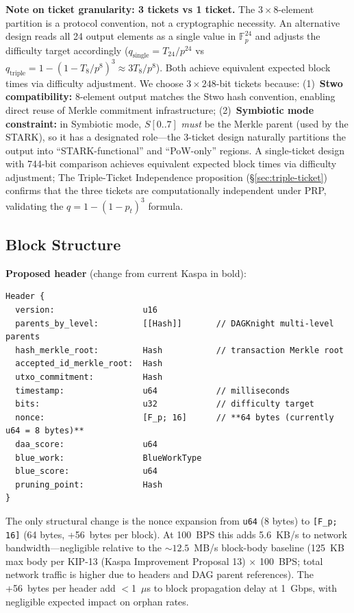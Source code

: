 \documentclass[11pt,a4paper]{article}
\begin{document}
\textbf{Note on ticket granularity: 3 tickets vs 1 ticket.} The $3 \times 8$-element partition is a protocol convention, not a cryptographic necessity. An alternative design reads all 24 output elements as a single value in $\mathbb{F}_p^{24}$ and adjusts the difficulty target accordingly ($q_{\mathrm{single}} = T_{24}/p^{24}$ vs $q_{\mathrm{triple}} = 1-(1-T_8/p^8)^3 \approx 3 T_8/p^8$). Both achieve equivalent expected block times via difficulty adjustment. We choose $3 \times 248$-bit tickets because: (1)~\textbf{Stwo compatibility:} 8-element output matches the Stwo hash convention, enabling direct reuse of Merkle commitment infrastructure; (2)~\textbf{Symbiotic mode constraint:} in Symbiotic mode, $S[0..7]$ \emph{must} be the Merkle parent (used by the STARK), so it has a designated role---the 3-ticket design naturally partitions the output into ``STARK-functional'' and ``PoW-only'' regions. A single-ticket design with 744-bit comparison achieves equivalent expected block times via difficulty adjustment; The Triple-Ticket Independence proposition (\S\ref{sec:triple-ticket}) confirms that the three tickets are computationally independent under PRP, validating the $q = 1-(1-p_t)^3$ formula.

\subsection{Block Structure}
\label{sec:block}

\textbf{Proposed header} (change from current Kaspa in bold):

\begin{Verbatim}[fontsize=\small]
Header {
  version:                  u16
  parents_by_level:         [[Hash]]       // DAGKnight multi-level parents
  hash_merkle_root:         Hash           // transaction Merkle root
  accepted_id_merkle_root:  Hash
  utxo_commitment:          Hash
  timestamp:                u64            // milliseconds
  bits:                     u32            // difficulty target
  nonce:                    [F_p; 16]      // **64 bytes (currently u64 = 8 bytes)**
  daa_score:                u64
  blue_work:                BlueWorkType
  blue_score:               u64
  pruning_point:            Hash
}
\end{Verbatim}

The only structural change is the nonce expansion from \texttt{u64} (8 bytes) to \texttt{[F\_p; 16]} (64 bytes, +56~bytes per block). At 100~BPS this adds 5.6~KB/s to network bandwidth---negligible relative to the ${\sim}12.5$~MB/s block-body baseline (125~KB max body per KIP-13 (Kaspa Improvement Proposal 13) $\times$ 100~BPS; total network traffic is higher due to headers and DAG parent references). The +56~bytes per header add $<$1~$\mu$s to block propagation delay at 1~Gbps, with negligible expected impact on orphan rates.
\end{document}
